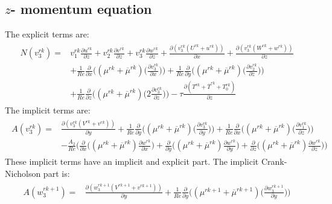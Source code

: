 \documentclass[preprint,12pt]{article}
\begin{document}
\subsection{$z$- momentum equation}
The explicit terms are:
\begin{align}\begin{split}
N(v_3^{rk})=&v_1^{rk}\frac{\partial u^{rk}}{\partial z}+v_2^{rk}\frac{\partial v^{rk}}{\partial z}+v_3^{rk}\frac{\partial w^{rk}}{\partial z}+\frac{\partial (v_3^{rk}(U^{rk}+u^{rk}))}{\partial x}+\frac{\partial (v_3^{rk}(W^{rk}+w^{rk}))}{\partial z}\\&+\frac{1}{Re}\frac{\partial}{\partial x}\Big(({\mu}^{rk}+\overline{\mu}^{rk})\Big(\frac{\partial v_3^{rk}}{\partial x}\Big)\Big)+\frac{1}{Re}\frac{\partial}{\partial y}\Big(({\mu}^{rk}+\overline{\mu}^{rk})\Big(\frac{\partial v_2^{rk}}{\partial z}\Big)\Big)\\&+\frac{1}{Re}\frac{\partial}{\partial z}\Big(({\mu}^{rk}+\overline{\mu}^{rk})\Big(2\frac{\partial v_3^{rk}}{\partial z}\Big)\Big)-\tau\frac{\partial (T^{rk}+\overline{T}^{rk}+T_0^{rk})}{\partial z}
\end{split} \end{align}	
The implicit terms are:
\begin{align}\begin{split}
A(v_3^{rk})=&\frac{\partial (v_3^{rk}(V^{rk}+v^{rk}))}{\partial y}+\frac{1}{Re}\frac{\partial}{\partial y}\Big(({\mu}^{rk}+\overline{\mu}^{rk})\Big(\frac{\partial v_3^{rk}}{\partial y}\Big)\Big)+\frac{1}{Re}\frac{\partial}{\partial x}\Big(({\mu}^{rk}+\overline{\mu}^{rk})\Big(\frac{\partial v_1^{rk}}{\partial z}\Big)\Big)\\&-\frac{A_2}{Re}\Bigg(\frac{\partial}{\partial x}\Big((\mu^{rk}+\overline{\mu}^{rk})\frac{\partial w^{rk}}{\partial x}\Big)+\frac{\partial}{\partial y}\Big((\mu^{rk}+\overline{\mu}^{rk})\frac{\partial w^{rk}}{\partial y}\Big)+\frac{\partial}{\partial z}\Big((\mu^{rk}+\overline{\mu}^{rk})\frac{\partial w^{rk}}{\partial z}\Big)\Bigg)
\end{split} \end{align}	
These implicit terms have an implicit and explicit part. The implicit Crank- Nicholson part is:
\begin{align}\begin{split}
A(w_3^{rk+1})=&\frac{\partial (w_3^{rk+1}(V^{rk+1}+v^{rk+1}))}{\partial y}+\frac{1}{Re}\frac{\partial}{\partial y}\Big(({\mu}^{rk+1}+\overline{\mu}^{rk+1})\Big(\frac{\partial w_3^{rk+1}}{\partial y}\Big)\Big)
\end{split} \end{align}	
\end{document}
